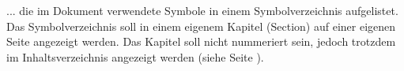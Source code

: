 
... die im Dokument verwendete Symbole in einem Symbolverzeichnis aufgelistet. Das Symbolverzeichnis soll in einem eigenem Kapitel (Section) auf einer eigenen Seite angezeigt werden. Das Kapitel soll nicht nummeriert sein, jedoch trotzdem im Inhaltsverzeichnis angezeigt werden (siehe Seite \pageref{toc}).
